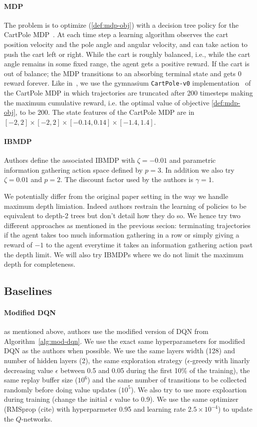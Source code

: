 \paragraph{MDP} The problem is to optimize (\ref{def:mdp-obj}) with a decision tree policy for the CartPole MDP~\cite{cartpole}.
At each time step a learning algorithm observes the cart position velocity and the pole angle and angular velocity, and can take action to push the cart left or right.
While the cart is roughly balanced, i.e., while the cart angle remains in some fixed range, the agent gets a positive reward.
If the cart is out of balance; the MDP transitions to an absorbing terminal state and gets 0 reward forever.
Like in~\cite{topin2021iterative}, we use the gymnasium \texttt{CartPole-v0} implementation~\cite{gymnasium} of the CartPole MDP in which trajectories are truncated after 200 timesteps making the maximum cumulative reward, i.e. the optimal value of objective \ref{def:mdp-obj}, to be 200.
The state features of the CartPole MDP are in $[-2, 2] \times [-2, 2] \times [-0.14, 0.14] \times [-1.4, 1.4]$.

\paragraph{IBMDP} Authors define the associated IBMDP with $\zeta=-0.01$ and parametric information gathering action space defined by $p=3$.
In addition we also try $\zeta=0.01$ and $p=2$.
The discount factor used by the authors is $\gamma=1$.

We potentially differ from the original paper setting in the way we handle maximum depth limiation. 
Indeed authors restrain the learning of policies to be equivalent to depth-2 trees but don't detail how they do so.
We hence try two different approaches as mentioned in the previous secion: terminating trajectories if the agent takes too much information gathering in a row or simply giving a reward of $-1$ to the agent everytime it takes an information gathering action past the depth limit.
We will also try IBMDPs where we do not limit the maximum depth for completeness.

\subsection{Baselines}
\paragraph{Modified DQN} as mentioned above, authors use the modified version of DQN from Algorithm~\ref{alg:mod-dqn}.
We use the exact same hyperparameters for modified DQN as the authors when possible. 
We use the same layers width (128) and number of hidden layers (2), the same exploration strategy ($\epsilon$-greedy with linarly decreasing value $\epsilon$ between 0.5 and 0.05 during the first 10\% of the training),
the same replay buffer size ($10^6$) and the same number of transitions to be collected randomly before doing value updates ($10^5$).
We also try to use more exploartion during training (change the initial $\epsilon$ value to 0.9).
We use the same optimizer (RMSprop (cite) with hyperparmeter 0.95 and learning rate $2.5 \times 10^{-4}$) to update the $Q$-networks.


